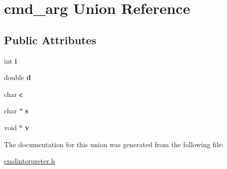 \hypertarget{unioncmd__arg}{}\section{cmd\+\_\+arg Union Reference}
\label{unioncmd__arg}
\subsection*{Public Attributes}
\begin{DoxyCompactItemize}
\item 
\mbox{\label{unioncmd__arg_a8fe8f65eae82cf560ab163f36a4fe792}} 
int {\bfseries i}
\item 
\mbox{\label{unioncmd__arg_a795d58d4e8ed6477a0ac02b987fba10f}} 
double {\bfseries d}
\item 
\mbox{\label{unioncmd__arg_a4b042ff544524607f806092c17ac483e}} 
char {\bfseries c}
\item 
\mbox{\label{unioncmd__arg_a4959441a5e4f4336f1abd02dd9e68133}} 
char $\ast$ {\bfseries s}
\item 
\mbox{\label{unioncmd__arg_a47718abc44dfb2ac5db7fc6867c15a72}} 
void $\ast$ {\bfseries v}
\end{DoxyCompactItemize}


The documentation for this union was generated from the following file\+:\begin{DoxyCompactItemize}
\item 
\mbox{\hyperlink{cmdinterpreter_8h}{cmdinterpreter.\+h}}\end{DoxyCompactItemize}
